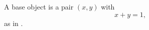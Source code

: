 
\begin{definition}\label{def:base}
A base object is a pair $(x, y)$ with
\begin{equation}\label{eq:base}
  x + y = 1 ,
\end{equation}
as in \cite[Def. 1]{alpha2020work}.
\end{definition}
